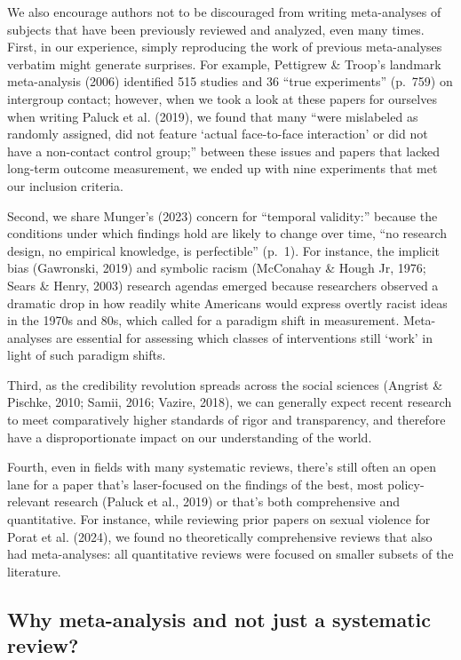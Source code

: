 \documentclass[
  ,jou]{apa6}
\begin{document}
We also encourage authors not to be discouraged from writing meta-analyses of subjects that have been previously reviewed and analyzed, even many times. First, in our experience, simply reproducing the work of previous meta-analyses verbatim might generate surprises. For example, Pettigrew \& Troop's landmark meta-analysis (2006) identified 515 studies and 36 ``true experiments'' (p.~759) on intergroup contact; however, when we took a look at these papers for ourselves when writing Paluck et al. (2019), we found that many ``were mislabeled as randomly assigned, did not feature `actual face-to-face interaction' or did not have a non-contact control group;'' between these issues and papers that lacked long-term outcome measurement, we ended up with nine experiments that met our inclusion criteria.

Second, we share Munger's (2023) concern for ``temporal validity:'' because the conditions under which findings hold are likely to change over time, ``no research design, no empirical knowledge, is perfectible'' (p.~1). For instance, the implicit bias (Gawronski, 2019) and symbolic racism (McConahay \& Hough Jr, 1976; Sears \& Henry, 2003) research agendas emerged because researchers observed a dramatic drop in how readily white Americans would express overtly racist ideas in the 1970s and 80s, which called for a paradigm shift in measurement. Meta-analyses are essential for assessing which classes of interventions still `work' in light of such paradigm shifts.

Third, as the credibility revolution spreads across the social sciences (Angrist \& Pischke, 2010; Samii, 2016; Vazire, 2018), we can generally expect recent research to meet comparatively higher standards of rigor and transparency, and therefore have a disproportionate impact on our understanding of the world.

Fourth, even in fields with many systematic reviews, there's still often an open lane for a paper that's laser-focused on the findings of the best, most policy-relevant research (Paluck et al., 2019) or that's both comprehensive and quantitative. For instance, while reviewing prior papers on sexual violence for Porat et al. (2024), we found no theoretically comprehensive reviews that also had meta-analyses: all quantitative reviews were focused on smaller subsets of the literature.

\subsection{Why meta-analysis and not just a systematic review?}\label{why-meta-analysis-and-not-just-a-systematic-review}
\end{document}
